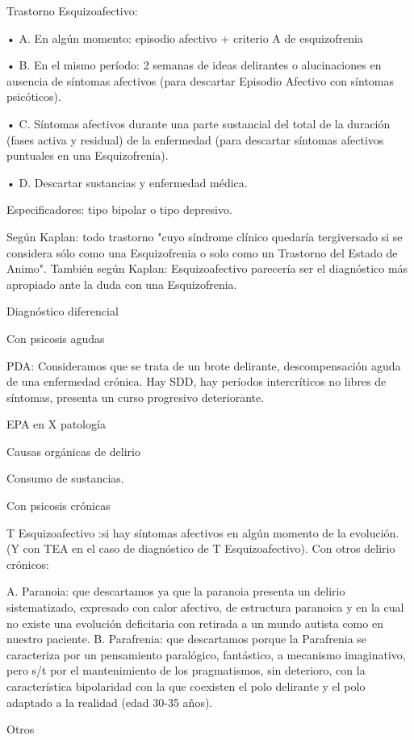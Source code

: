 \documentclass{scrbook}
\begin{document}
Trastorno Esquizoafectivo:

• A. En algún momento: episodio afectivo + criterio A de esquizofrenia

• B. En el mismo período: 2 semanas de ideas delirantes o alucinaciones en ausencia de síntomas afectivos (para descartar Episodio Afectivo con síntomas psicóticos).

• C. Síntomas afectivos durante una parte sustancial del total de la duración (fases activa y residual) de la enfermedad (para descartar síntomas afectivos puntuales en una Esquizofrenia).

• D. Descartar sustancias y enfermedad médica.

Especificadores: tipo bipolar o tipo depresivo.

Según Kaplan: todo trastorno "cuyo síndrome clínico quedaría tergiversado si se considera sólo como una Esquizofrenia o solo como un Trastorno del Estado de Animo". También según Kaplan: Esquizoafectivo parecería ser el diagnóstico más apropiado ante la duda con una Esquizofrenia.

Diagnóstico diferencial

Con psicosis agudas

PDA: Consideramos que se trata de un brote delirante, descompensación aguda de una enfermedad crónica. Hay SDD, hay períodos intercríticos no libres de síntomas, presenta un curso progresivo deteriorante.

EPA en X patología

Causas orgánicas de delirio

Consumo de sustancias.

Con psicosis crónicas

T Esquizoafectivo :si hay síntomas afectivos en algún momento de la evolución. (Y con TEA en el caso de diagnóstico de T Esquizoafectivo). Con otros delirio crónicos:

A. Paranoia: que descartamos ya que la paranoia presenta un delirio sistematizado, expresado con calor afectivo, de estructura paranoica y en la cual no existe una evolución deficitaria con retirada a un mundo autista como en nuestro paciente.
B. Parafrenia: que descartamos porque la Parafrenia se caracteriza por un pensamiento paralógico, fantástico, a mecanismo imaginativo, pero s/t por el mantenimiento de los pragmatismos, sin deterioro, con la característica bipolaridad con la que coexisten el polo delirante y el polo adaptado a la realidad (edad 30-35 años).

Otros
\end{document}
